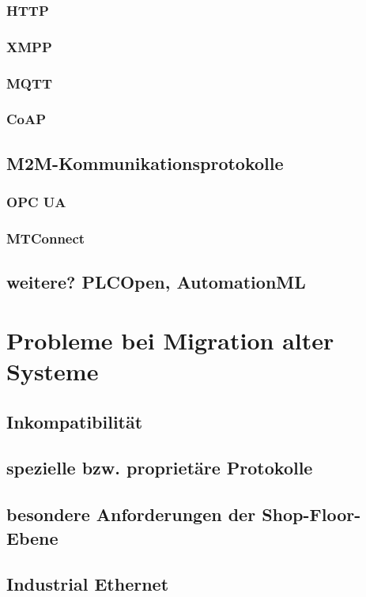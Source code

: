 \subsubsection{HTTP}
\subsubsection{XMPP}
\subsubsection{MQTT}
\subsubsection{CoAP}

\subsection{M2M-Kommunikationsprotokolle}
\subsubsection{OPC UA}
\subsubsection{MTConnect}
\subsection{weitere? PLCOpen, AutomationML}

\section{Probleme bei Migration alter Systeme}
\subsection{Inkompatibilität}
\subsection{spezielle bzw. proprietäre Protokolle}
\subsection{besondere Anforderungen der Shop-Floor-Ebene}
\subsection{Industrial Ethernet}

